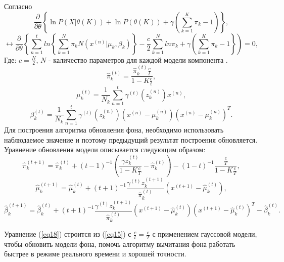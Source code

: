 Согласно \cite{Bishop2006}
\begin{equation}\label{eq13}
\frac{\partial}{\partial\theta}\left\{\ln P\left(X|\theta\left(K\right)\right)+\ln P\left(\theta\left(K\right)\right)+\gamma\left(\sum^K_{k=1}\pi_k-1\right)\right\},
\end{equation}
\begin{equation}\label{eq14}
\longleftrightarrow \frac{\partial}{\partial\theta}\left\{\sum^t_{n=1}ln\left\{\sum^N_{k=1}\pi_kN\left(x^{\left(n\right)}|\mu_k,\beta_k\right)\right\}-\frac{c}{2}\sum^N_{k=1}ln \pi_k + \gamma\left(\sum^K_{k=1}\pi_k-1\right\}\right) = 0,
\end{equation}
Где:
 $c=\frac{N}{2}$, $N$ - каличество параметров для каждой модели компонента \cite{Figueiredo2002}.
\begin{equation}\label{eq15}
\hat{\pi}^{\left(t\right)}_k = \frac{\hat{\pi}^{\left(t\right)}_k\frac{c}{t}}{1-K\frac{c}{t}},
\end{equation}
\begin{equation}\label{eq16}
\mu^{\left(t\right)}_k = \frac{1}{N_k}\sum^t_{n=1}\gamma^{\left(t\right)}\left(z^{\left(n\right)}_k\right)x^{\left(n\right)},
\end{equation}
\begin{equation}\label{eq17}
\beta^{\left(t\right)}_k =\frac{1}{N_k}\sum^t_{n=1}\gamma^{\left(t\right)}\left(z^{\left(n\right)}_k\right)\left(x^{\left(n\right)}-\mu^{\left(n\right)}_k\right)\left(x^{\left(n\right)}-\mu^{\left(n\right)}_k\right)^T.
\end{equation}
Для построения алгоритма обновления фона, необходимо использовать наблюдаемое значение и поэтому предыдущий результат построения обновляется. Уравнение обновления модели описывается следующим образом:
\begin{equation}\label{eq18}
\hat{\pi}^{\left(t+1\right)}_k=\hat{\pi}^{\left(t\right)}_k + \left(t-1\right)^{-1} \left(\frac{\gamma z^{\left(t\right)}_k}{1-K\frac{c}{T}} - \hat{\pi}^{\left(t\right)}_k\right) - \left(1-t\right)^{-1} \frac{\frac{c}{T}}{1-K\frac{c}{T}},
\end{equation}
\begin{equation}\label{eq19}
\hat{\mu}^{\left(t+1\right)}_k = \hat{\mu}^{\left(t\right)}_k + \left(t+1\right)^{-1} \frac{\gamma^{\left(t\right)}z^{\left(t+1\right)}_k}{\hat{\pi}^{\left(t\right)}_k}\left(x^{\left(t+1\right)}-\hat{\mu}^{\left(t\right)}_k\right),
\end{equation}
\begin{equation}\label{eq20}
\hat{\beta}^{\left(t+1\right)}_k = \hat{\beta}^{\left(t\right)}_k + \left(t+1\right)^{-1} \frac{\gamma^{\left(t\right)}z^{\left(t+1\right)}_k}{\hat{\pi}^{\left(t\right)}_k} \left(x^{\left(t+1\right)}-\hat{\mu}^{\left(t\right)}_k\right)\left(x^{\left(t+1\right)}-\hat{\mu}^{\left(t\right)}_k\right)^T - \hat{\beta}^{\left(t\right)}_k.
\end{equation}

Уравнение (\ref{eq18}) строится из (\ref{eq15}) с $\frac{c}{t}=\frac{c}{T}$  с применением гауссовой модели, чтобы обновить модели фона, помочь алгоритму вычитания фона работать быстрее в режиме реального времени и хорошей точности.


